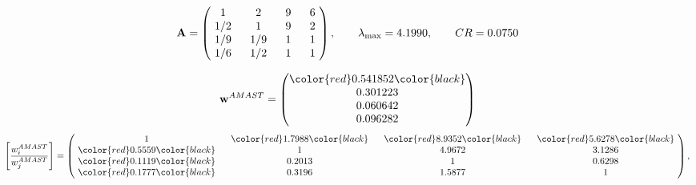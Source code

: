 \begin{example}
\begin{equation*}
\mathbf{A} =
\begin{pmatrix}
$\,\,$ 1 $\,\,$ & $\,\,$2$\,\,$ & $\,\,$9$\,\,$ & $\,\,$6 $\,\,$ \\
$\,\,$ 1/2$\,\,$ & $\,\,$ 1 $\,\,$ & $\,\,$9$\,\,$ & $\,\,$2 $\,\,$ \\
$\,\,$ 1/9$\,\,$ & $\,\,$ 1/9$\,\,$ & $\,\,$ 1 $\,\,$ & $\,\,$1 $\,\,$ \\
$\,\,$ 1/6$\,\,$ & $\,\,$ 1/2$\,\,$ & $\,\,$ 1 $\,\,$ & $\,\,$ 1  $\,\,$ \\
\end{pmatrix},
\qquad
\lambda_{\max} =
4.1990,
\qquad
CR = 0.0750
\end{equation*}

\begin{equation*}
\mathbf{w}^{AMAST} =
\begin{pmatrix}
\color{red} 0.541852\color{black} \\
0.301223\\
0.060642\\
0.096282
\end{pmatrix}\end{equation*}
\begin{equation*}
\left[ \frac{{w}^{AMAST}_i}{{w}^{AMAST}_j} \right] =
\begin{pmatrix}
$\,\,$ 1 $\,\,$ & $\,\,$\color{red} 1.7988\color{black} $\,\,$ & $\,\,$\color{red} 8.9352\color{black} $\,\,$ & $\,\,$\color{red} 5.6278\color{black} $\,\,$ \\
$\,\,$\color{red} 0.5559\color{black} $\,\,$ & $\,\,$ 1 $\,\,$ & $\,\,$4.9672$\,\,$ & $\,\,$3.1286  $\,\,$ \\
$\,\,$\color{red} 0.1119\color{black} $\,\,$ & $\,\,$0.2013$\,\,$ & $\,\,$ 1 $\,\,$ & $\,\,$0.6298 $\,\,$ \\
$\,\,$\color{red} 0.1777\color{black} $\,\,$ & $\,\,$0.3196$\,\,$ & $\,\,$1.5877$\,\,$ & $\,\,$ 1  $\,\,$ \\
\end{pmatrix},
\end{equation*}


\end{example}
